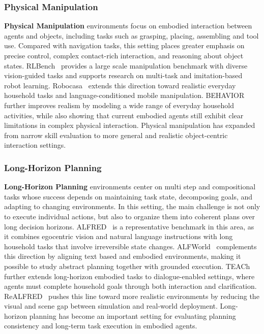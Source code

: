 \subsubsection{Physical Manipulation}
\label{Physical Manipulation}
\textbf{Physical Manipulation} environments focus on embodied interaction between agents and objects, including tasks such as grasping, placing, assembling and tool use. Compared with navigation tasks, this setting places greater emphasis on precise control, complex contact-rich interaction, and reasoning about object states. RLBench~\cite{RLBench} provides a large scale manipulation benchmark with diverse vision-guided tasks and supports research on multi-task and imitation-based robot learning. Robocasa~\cite{Robocasa} extends this direction toward realistic everyday household tasks and language-conditioned mobile manipulation. BEHAVIOR~\cite{BEHAVIOR} further improves realism by modeling a wide range of everyday household activities, while also showing that current embodied agents still exhibit clear limitations in complex physical interaction. Physical manipulation has expanded from narrow skill evaluation to more general and realistic object-centric interaction settings.

\subsubsection{Long-Horizon Planning}
\label{Long-Horizon Planning}
\textbf{Long-Horizon Planning} environments center on multi step and compositional tasks whose success depends on maintaining task state, decomposing goals, and adapting to changing environments. In this setting, the main challenge is not only to execute individual actions, but also to organize them into coherent plans over long decision horizons.
ALFRED~\cite{ALFRED} is a representative benchmark in this area, as it combines egocentric vision and natural language instructions with long household tasks that involve irreversible state changes. ALFWorld~\cite{ALFWorld} complements this direction by aligning text based and embodied environments, making it possible to study abstract planning together with grounded execution. TEACh~\cite{TEAch} further extends long-horizon embodied tasks to dialogue-enabled settings, where agents must complete household goals through both interaction and clarification. ReALFRED~\cite{ReALFRED} pushes this line toward more realistic environments by reducing the visual and scene gap between simulation and real-world deployment. Long-horizon planning has become an important setting for evaluating planning consistency and long-term task execution in embodied agents.

